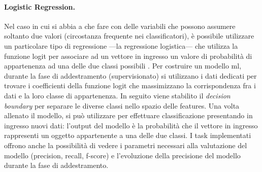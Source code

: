 \documentclass[12pt,a4paper,fleqn,titlepage]{report}
\begin{document}
        \paragraph{Logistic Regression.}
        Nel caso in cui si abbia a che fare con delle variabili che possono assumere soltanto due valori (circostanza frequente nei classificatori), è possibile utilizzare un particolare tipo di regressione —la regressione logistica— che utilizza la funzione logit per associare ad un vettore in ingresso un valore di probabilità di appartenenza ad una delle due classi possibili \cite{dobson:2018, hosmer:2013}.
        Per costruire un modello \gls{ml}, durante la fase di addestramento (supervisionato) si utilizzano i dati dedicati per trovare i coefficienti della funzione logit che massimizzano la corrispondenza fra i dati e la loro classe di appartenenza. In seguito viene stabilito il \emph{decision boundary} per separare le diverse classi nello spazio delle features. Una volta allenato il modello, si può utilizzare per effettuare classificazione presentando in ingresso nuovi dati: l'output del modello è la probabilità che il vettore in ingresso rappresenti un oggetto appartenente a una delle due classi. I task implementati offrono anche la possibilità di vedere i parametri necessari alla valutazione del modello (precision, recall, f-score) e l'evoluzione della precisione del modello durante la fase di addestramento.



\end{document}
